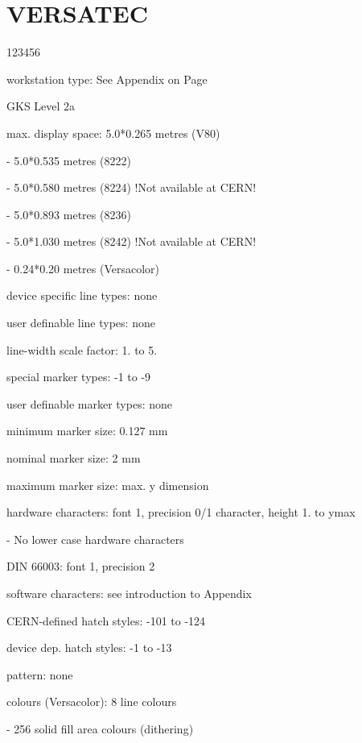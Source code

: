 \section{VERSATEC}
\begin{DLtt}{123456}
\item[workstation type:]See Appendix on Page~\pageref{sec:gtstyp}
\item[GKS Level]2a
\item[max. display space:]5.0*0.265 metres (V80)
\item[-]5.0*0.535 metres (8222)
\item[-]5.0*0.580 metres (8224) !Not available at CERN!
\item[-]5.0*0.893 metres (8236)
\item[-]5.0*1.030 metres (8242) !Not available at CERN!
\item[-]0.24*0.20 metres (Versacolor)
\item[device specific line types:]none
\item[user definable line types:]none
\item[line-width scale factor:]1. to 5.
\item[special marker types:]-1 to -9
\item[user definable marker types:]none
\item[minimum marker size:]0.127 mm
\item[nominal marker size:]2 mm
\item[maximum marker size:]max. y dimension
\item[hardware characters:]font 1, precision 0/1 character, height 1. to ymax
\item[-]No lower case hardware characters
\item[DIN 66003:]font 1, precision 2
\item[software characters:]see introduction to Appendix
\item[CERN-defined hatch styles:]-101 to -124
\item[device dep. hatch styles:]-1 to -13
\item[pattern:]none
\item[colours (Versacolor):]8 line colours
\item[-]256 solid fill area colours (dithering)
\end{DLtt}
